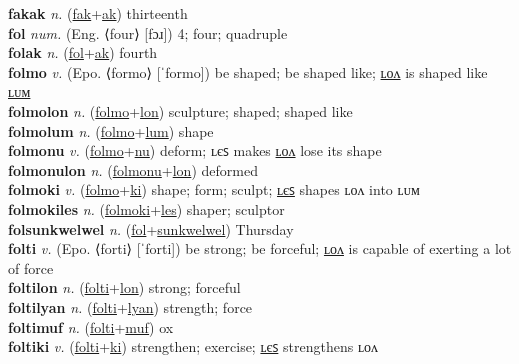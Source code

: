 \textbf{fakak} \textit{n.} (\hyperref[fak]{fak}+\hyperref[ak]{ak})
thirteenth \label{fakak} \\
\textbf{fol} \textit{num.} (Eng. ⟨four⟩ [fɔɹ])
4; four; quadruple \label{fol} \\
\textbf{folak} \textit{n.} (\hyperref[fol]{fol}+\hyperref[ak]{ak})
fourth \label{folak} \\
\textbf{folmo} \textit{v.} (Epo. ⟨formo⟩ [ˈformo])
be shaped; be shaped like; \hyperref[folmolon]{ʟᴏᴧ} is shaped like \hyperref[folmolum]{ʟᴜᴍ} \label{folmo} \\
\textbf{folmolon} \textit{n.} (\hyperref[folmo]{folmo}+\hyperref[lon]{lon})
sculpture; shaped; shaped like \label{folmolon} \\
\textbf{folmolum} \textit{n.} (\hyperref[folmo]{folmo}+\hyperref[lum]{lum})
shape \label{folmolum} \\
\textbf{folmonu} \textit{v.} (\hyperref[folmo]{folmo}+\hyperref[nu]{nu})
deform; ʟєꜱ makes \hyperref[folmonulon]{ʟᴏᴧ} lose its shape \label{folmonu} \\
\textbf{folmonulon} \textit{n.} (\hyperref[folmonu]{folmonu}+\hyperref[lon]{lon})
deformed \label{folmonulon} \\
\textbf{folmoki} \textit{v.} (\hyperref[folmo]{folmo}+\hyperref[ki]{ki})
shape; form; sculpt; \hyperref[folmokiles]{ʟєꜱ} shapes ʟᴏᴧ into ʟᴜᴍ \label{folmoki} \\
\textbf{folmokiles} \textit{n.} (\hyperref[folmoki]{folmoki}+\hyperref[les]{les})
shaper; sculptor \label{folmokiles} \\
\textbf{folsunkwelwel} \textit{n.} (\hyperref[fol]{fol}+\hyperref[sunkwelwel]{sunkwelwel})
Thursday \label{folsunkwelwel} \\
\textbf{folti} \textit{v.} (Epo. ⟨forti⟩ [ˈforti])
be strong; be forceful; \hyperref[foltilon]{ʟᴏᴧ} is capable of exerting a lot of force \label{folti} \\
\textbf{foltilon} \textit{n.} (\hyperref[folti]{folti}+\hyperref[lon]{lon})
strong; forceful \label{foltilon} \\
\textbf{foltilyan} \textit{n.} (\hyperref[folti]{folti}+\hyperref[lyan]{lyan})
strength; force \label{foltilyan} \\
\textbf{foltimuf} \textit{n.} (\hyperref[folti]{folti}+\hyperref[muf]{muf})
ox \label{foltimuf} \\
\textbf{foltiki} \textit{v.} (\hyperref[folti]{folti}+\hyperref[ki]{ki})
strengthen; exercise; \hyperref[foltikiles]{ʟєꜱ} strengthens ʟᴏᴧ \label{foltiki} \\
